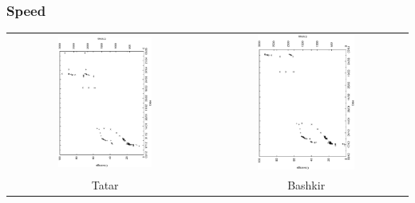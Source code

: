 \documentclass[10pt,xetex]{beamer} %
\begin{document}
\begin{frame}
  \frametitle{Speed}

\begin{center}
\begin{tabular}{cc}

\includegraphics[angle=270,width=0.5\textwidth]{hist-tt.ps} &  \includegraphics[angle=270,width=0.5\textwidth]{hist-ba.ps} \\
Tatar & Bashkir \\
\end{tabular}
\end{center}

\end{frame}
\end{document}
